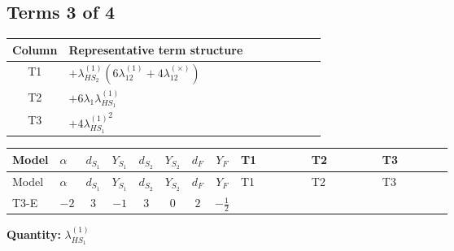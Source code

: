 \documentclass[8pt]{article}
\begin{document}
\begin{landscape}
\subsection*{Terms 3 of 4}
\begin{center}
\begin{tabular}{@{}c >{\raggedright\arraybackslash}p{0.82\linewidth}@{}}
\toprule
Column & Representative term structure \\
\midrule
T1 & \(\displaystyle +{\lambda_{HS_2}^{(1)}} (6 {\lambda_{12}^{(1)}}+4 {\lambda_{12}^{(\times)}})\) \\
\midrule
T2 & \(\displaystyle +6 {\lambda_1} {\lambda_{HS_1}^{(1)}}\) \\
\midrule
T3 & \(\displaystyle +4 {\lambda_{HS_1}^{(1)}}^2\) \\
\midrule
\bottomrule
\end{tabular}
\end{center}
\smallskip
\tiny
\begin{longtable}{@{}llcccccc >{\raggedright\arraybackslash}p{0.21\linewidth} >{\raggedright\arraybackslash}p{0.21\linewidth} >{\raggedright\arraybackslash}p{0.21\linewidth}@{}}
\toprule
Model & $\alpha$ & $d_{S_1}$ & $Y_{S_1}$ & $d_{S_2}$ & $Y_{S_2}$ & $d_F$ & $Y_F$ & T1 & T2 & T3 \\
\midrule
\endfirsthead
\toprule
Model & $\alpha$ & $d_{S_1}$ & $Y_{S_1}$ & $d_{S_2}$ & $Y_{S_2}$ & $d_F$ & $Y_F$ & T1 & T2 & T3 \\
\midrule
\endhead
T3-E & $-2$ & $3$ & $-1$ & $3$ & $0$ & $2$ & $-\frac{1}{2}$ & \scriptsize\adjustbox{max width=\linewidth}{$\begin{gathered} +{\lambda_{HS_2}^{(1)}} (6 {\lambda_{12}^{(1)}}+4 {\lambda_{12}^{(\times)}})\end{gathered}$} & \scriptsize\adjustbox{max width=\linewidth}{$\begin{gathered} +6 {\lambda_1} {\lambda_{HS_1}^{(1)}}\end{gathered}$} & \scriptsize\adjustbox{max width=\linewidth}{$\begin{gathered} +4 {\lambda_{HS_1}^{(1)}}^2\end{gathered}$} \\
\midrule
\bottomrule
\end{longtable}
\clearpage
\noindent\textbf{Quantity: }$\lambda_{HS_1}^{(1)}$\par\smallskip

\end{landscape}
\end{document}
